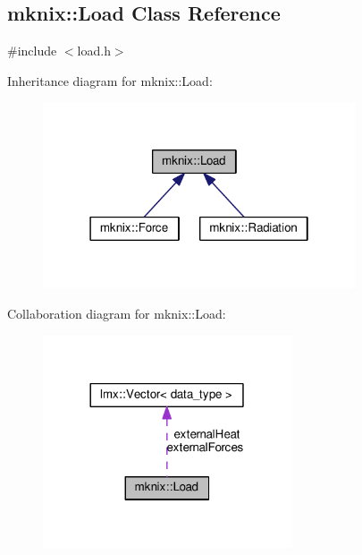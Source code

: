 \hypertarget{classmknix_1_1_load}{}\subsection{mknix\+:\+:Load Class Reference}
\label{classmknix_1_1_load}


{\ttfamily \#include $<$load.\+h$>$}



Inheritance diagram for mknix\+:\+:Load\+:\nopagebreak
\begin{figure}[H]
\begin{center}
\leavevmode
\includegraphics[width=262pt]{d2/dcd/classmknix_1_1_load__inherit__graph}
\end{center}
\end{figure}


Collaboration diagram for mknix\+:\+:Load\+:\nopagebreak
\begin{figure}[H]
\begin{center}
\leavevmode
\includegraphics[width=209pt]{d5/d29/classmknix_1_1_load__coll__graph}
\end{center}
\end{figure}
